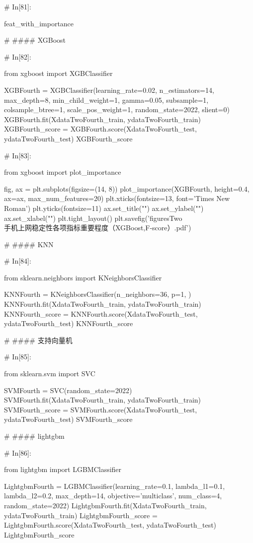 \documentclass{MathorCupmodeling}
\begin{document}
\begin{python}
	# In[81]:
	
	
	feat_with_importance
	
	# #### XGBoost
	
	# In[82]:
	
	
	from xgboost import XGBClassifier
	
	XGBFourth = XGBClassifier(learning_rate=0.02,
							  n_estimators=14,
							  max_depth=8,
							  min_child_weight=1,
							  gamma=0.05,
							  subsample=1,
							  colsample_btree=1,
							  scale_pos_weight=1,
							  random_state=2022,
							  slient=0)
	XGBFourth.fit(XdataTwoFourth_train, ydataTwoFourth_train)
	XGBFourth_score = XGBFourth.score(XdataTwoFourth_test, ydataTwoFourth_test)
	XGBFourth_score
	
	# In[83]:
	
	
	from xgboost import plot_importance
	
	fig, ax = plt.subplots(figsize=(14, 8))
	plot_importance(XGBFourth, height=0.4, ax=ax, max_num_features=20)
	plt.xticks(fontsize=13, font='Times New Roman')
	plt.yticks(fontsize=11)
	ax.set_title("")
	ax.set_ylabel("")
	ax.set_xlabel("")
	plt.tight_layout()
	plt.savefig('figuresTwo\\[附件2]手机上网稳定性各项指标重要程度（XGBoost,F-score）.pdf')
	
	# #### KNN
	
	# In[84]:
	
	
	from sklearn.neighbors import KNeighborsClassifier
	
	KNNFourth = KNeighborsClassifier(n_neighbors=36, p=1, )
	KNNFourth.fit(XdataTwoFourth_train, ydataTwoFourth_train)
	KNNFourth_score = KNNFourth.score(XdataTwoFourth_test, ydataTwoFourth_test)
	KNNFourth_score
	
	# #### 支持向量机
	
	# In[85]:
	
	
	from sklearn.svm import SVC
	
	SVMFourth = SVC(random_state=2022)
	SVMFourth.fit(XdataTwoFourth_train, ydataTwoFourth_train)
	SVMFourth_score = SVMFourth.score(XdataTwoFourth_test, ydataTwoFourth_test)
	SVMFourth_score
	
	# #### lightgbm
	
	# In[86]:
	
	
	from lightgbm import LGBMClassifier
	
	LightgbmFourth = LGBMClassifier(learning_rate=0.1,
									lambda_l1=0.1,
									lambda_l2=0.2,
									max_depth=14,
									objective='multiclass',
									num_class=4,
									random_state=2022)
	LightgbmFourth.fit(XdataTwoFourth_train, ydataTwoFourth_train)
	LightgbmFourth_score = LightgbmFourth.score(XdataTwoFourth_test, ydataTwoFourth_test)
	LightgbmFourth_score
	

\end{python}
\end{document}
